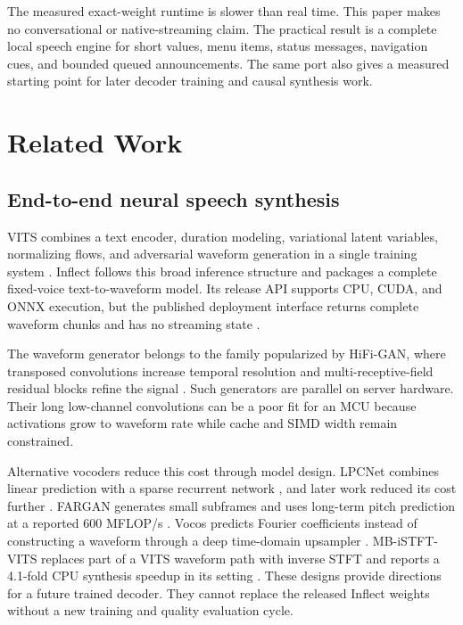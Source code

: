 \documentclass[10pt]{article}
\begin{document}
The measured exact-weight runtime is slower than real time. This paper makes
no conversational or native-streaming claim. The practical result is a
complete local speech engine for short values, menu items, status messages,
navigation cues, and bounded queued announcements. The same port also gives a
measured starting point for later decoder training and causal synthesis work.

\section{Related Work}

\subsection{End-to-end neural speech synthesis}

VITS combines a text encoder, duration modeling, variational latent
variables, normalizing flows, and adversarial waveform generation in a single
training system \cite{kim2021vits}. Inflect follows this broad inference
structure and packages a complete fixed-voice text-to-waveform model. Its
release API supports CPU, CUDA, and ONNX execution, but the published
deployment interface returns complete waveform chunks and has no streaming
state \cite{song2026inflectdeployment,song2026inflectonnx}.

The waveform generator belongs to the family popularized by HiFi-GAN, where
transposed convolutions increase temporal resolution and multi-receptive-field
residual blocks refine the signal \cite{kong2020hifigan}. Such generators are
parallel on server hardware. Their long low-channel convolutions can be a poor
fit for an MCU because activations grow to waveform rate while cache and SIMD
width remain constrained.

Alternative vocoders reduce this cost through model design. LPCNet combines
linear prediction with a sparse recurrent network \cite{valin2019lpcnet}, and
later work reduced its cost further \cite{valin2022shoestring}. FARGAN
generates small subframes and uses long-term pitch prediction at a reported
600 MFLOP/s \cite{valin2024fargan}. Vocos predicts Fourier coefficients
instead of constructing a waveform through a deep time-domain upsampler
\cite{siuzdak2024vocos}. MB-iSTFT-VITS replaces part of a VITS waveform path
with inverse STFT and reports a 4.1-fold CPU synthesis speedup in its setting
\cite{kawamura2023mbistftvits}. These designs provide directions for a future
trained decoder. They cannot replace the released Inflect weights without a
new training and quality evaluation cycle.
\end{document}
